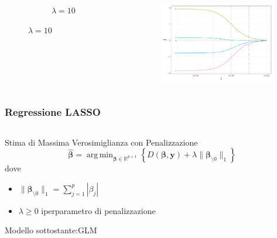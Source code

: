 \documentclass[pdf, aspectratio=169]{beamer}\usepackage[]{graphicx}\usepackage[]{color}
\DeclareMathOperator*{\argmin}{arg\,min}  %
\theoremstyle{definition}
\begin{document}
\begin{frame}
\begin{columns}[c]
\begin{column}{0.55\linewidth}
\begin{figure}
\begin{subfigure}[b]{3cm}
      \caption{$\lambda = 10$}
    \end{subfigure}
  \end{figure}
\end{column}
\begin{column}{0.45\linewidth}
  \begin{figure}
    \centering
    \includegraphics[width=5cm]{_bookdown_files/_main_files/figure-latex/ridge-lambda-5.pdf}
  \end{figure}
\end{column}
\end{columns}

\end{frame}


\begin{frame}
\frametitle{Regressione LASSO}

\begin{columns}
\begin{column}{0.8\linewidth}
  \begin{block}{Stima di Massima Verosimiglianza con Penalizzazione}
    $$
    \hat{\boldsymbol{\beta}} = \argmin_{\boldsymbol{\beta}\in\mathbb{R}^{p+1}}{\left\{D(\boldsymbol{\beta}, \boldsymbol{y}) + \lambda \|\boldsymbol{\beta}_{\setminus0}\|_1\right\}}
    $$
    dove
    \begin{itemize}
      \item $\|\boldsymbol{\beta}_{\setminus0}\|_1 = \sum_{j=1}^p{|\beta_j|}$
      \item $\lambda\ge0$ iperparametro di penalizzazione
    \end{itemize}
    
    \vspace{0.2cm}
    
    Modello sottostante:GLM
  \end{block}
\end{column}
\end{columns}

\end{frame}
\end{document}
